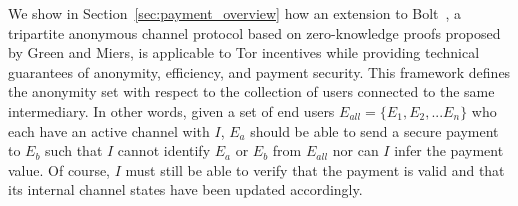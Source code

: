  We show in Section~\ref{sec:payment_overview} how an extension to
 Bolt~\cite{green2017bolt}, a tripartite anonymous channel protocol based on
 zero-knowledge proofs proposed by Green and Miers, is applicable to Tor
 incentives while providing technical guarantees of anonymity, efficiency, and
 payment security. This framework defines the anonymity set with respect to the
 collection of users connected to the same intermediary. In other words, given a
 set of end users $E_{all} = \{E_1, E_2, ... E_n\}$ who each have an active
 channel with $I$, $E_a$ should be able to send a secure payment to $E_b$ such
 that $I$ cannot identify $E_a$ or $E_b$ from $E_{all}$ nor can $I$ infer the
 payment value. Of course, $I$ must still be able to verify that the payment is
 valid and that its internal channel states have been updated accordingly.


